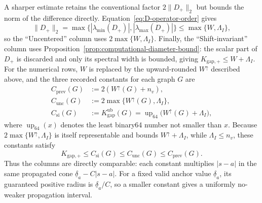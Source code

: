 \documentclass[11pt, a4paper]{article}
\newcommand{\norm}[1]{\| #1 \|}
\begin{document}
A sharper estimate retains the conventional factor $2\norm{D_+}_2$ but bounds the norm of the difference directly. Equation~\eqref{eq:D-operator-order} gives
\begin{equation}
\label{eq:computational-uncentered-bound}
\norm{D_+}_2
=\max\{|\lambda_{\min}(D_+)|,|\lambda_{\max}(D_+)|\}
\le\max\{W,\Lambda_I\},
\end{equation}
so the ``Uncentered'' column uses $2\max\{W,\Lambda_I\}$. Finally, the ``Shift-invariant'' column uses Proposition~\ref{prop:computational-diameter-bound}: the scalar part of $D_+$ is discarded and only its spectral width is bounded, giving $K_{\mathrm{gap},+}\le W+\Lambda_I$. For the numerical rows, $W$ is replaced by the upward-rounded $W^\uparrow$ described above, and the three recorded constants for each graph $G$ are
\begin{equation}
\label{eq:bound-comparison-constants}
\begin{aligned}
C_{\mathrm{prev}}(G)&:=2(W^\uparrow(G)+n_v),\\
C_{\mathrm{unc}}(G)&:=2\max\{W^\uparrow(G),\Lambda_I\},\\
C_{\mathrm{si}}(G)&:=K_{\mathrm{gap}}^{\mathrm{ub}}(G)
=\operatorname{up}_{64}\!\bigl(W^\uparrow(G)+\Lambda_I\bigr),
\end{aligned}
\end{equation}
where $\operatorname{up}_{64}(x)$ denotes the least binary64 number not smaller than $x$. Because $2\max\{W^\uparrow,\Lambda_I\}$ is itself representable and bounds $W^\uparrow+\Lambda_I$, while $\Lambda_I\le n_v$, these constants satisfy
\begin{equation}
K_{\mathrm{gap},+}
\le C_{\mathrm{si}}(G)
\le C_{\mathrm{unc}}(G)
\le C_{\mathrm{prev}}(G).
\end{equation}
Thus the columns are directly comparable: each constant multiplies $|s-a|$ in the same propagated cone $\underline\delta_a-C|s-a|$. For a fixed valid anchor value $\underline\delta_a$, its guaranteed positive radius is $\underline\delta_a/C$, so a smaller constant gives a uniformly no-weaker propagation interval.
\end{document}
